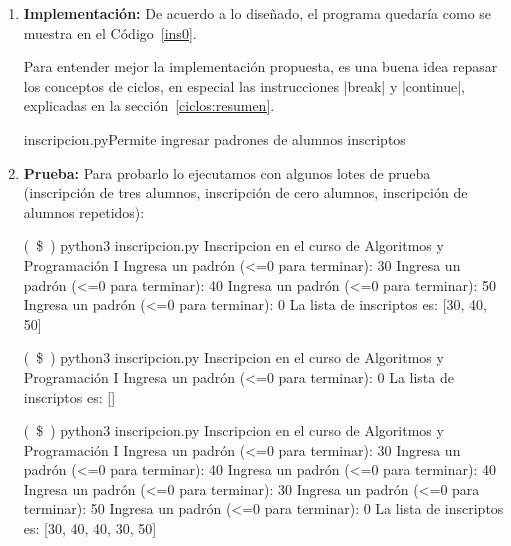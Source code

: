\begin{enumerate}
\begin{itemize}
\begin{codigo-nohl-sn}
La lista de inscriptos es vacía
Repetir indefinidamente:
    Pedir padrón
    Si el padrón no es positivo:
        Salir del ciclo
	Agregar el padrón a la lista
Devolver la lista de inscriptos
\end{codigo-nohl-sn}

\end{itemize}

\item {\bf Implementación:}
De acuerdo a lo diseñado, el programa quedaría como
se muestra en el Código~\ref{ins0}.

\begin{observacion}
Para entender mejor la implementación propuesta, es una buena idea repasar los
conceptos de ciclos, en especial las instrucciones |break| y |continue|,
explicadas en la sección~\ref{ciclos:resumen}.
\end{observacion}

\begin{codigo}{inscripcion.py}{Permite ingresar padrones de alumnos
inscriptos}
\label{ins0}

\end{codigo}

\item {\bf Prueba:}
Para probarlo lo ejecutamos con algunos lotes de prueba (inscripción de
tres alumnos, inscripción de cero alumnos, inscripción de alumnos
repetidos):

\begin{codigo-nohl-sn}
(~\$~) python3 inscripcion.py
Inscripcion en el curso de Algoritmos y Programación I
Ingresa un padrón (<=0 para terminar): 30
Ingresa un padrón (<=0 para terminar): 40
Ingresa un padrón (<=0 para terminar): 50
Ingresa un padrón (<=0 para terminar): 0
La lista de inscriptos es: [30, 40, 50]

(~\$~) python3 inscripcion.py
Inscripcion en el curso de Algoritmos y Programación I
Ingresa un padrón (<=0 para terminar): 0
La lista de inscriptos es: []

(~\$~) python3 inscripcion.py
Inscripcion en el curso de Algoritmos y Programación I
Ingresa un padrón (<=0 para terminar): 30
Ingresa un padrón (<=0 para terminar): 40
Ingresa un padrón (<=0 para terminar): 40
Ingresa un padrón (<=0 para terminar): 30
Ingresa un padrón (<=0 para terminar): 50
Ingresa un padrón (<=0 para terminar): 0
La lista de inscriptos es: [30, 40, 40, 30, 50]
\end{codigo-nohl-sn}


\end{enumerate}
